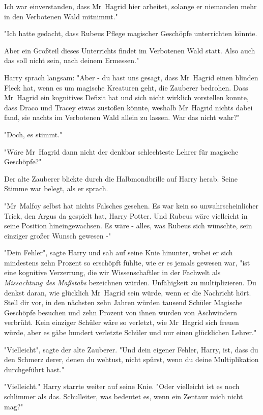 {Ich war einverstanden, dass Mr~Hagrid hier arbeitet, solange er niemanden mehr in den Verbotenen Wald mitnimmt."

"Ich hatte gedacht, dass Rubeus Pflege magischer Geschöpfe unterrichten könnte.

Aber ein Großteil dieses Unterrichts findet im Verbotenen Wald statt. Also auch das soll nicht sein, nach deinem Ermessen."

Harry sprach langsam: "Aber - du hast uns gesagt, dass Mr~Hagrid einen blinden Fleck hat, wenn es um magische Kreaturen geht, die Zauberer bedrohen. Dass Mr~Hagrid ein kognitives Defizit hat und sich nicht wirklich vorstellen konnte, dass Draco und Tracey etwas zustoßen könnte, weshalb Mr~Hagrid nichts dabei fand, sie nachts im Verbotenen Wald allein zu lassen. War das nicht wahr?"

"Doch, es stimmt."

"Wäre Mr~Hagrid dann nicht der denkbar schlechteste Lehrer für magische Geschöpfe?"

Der alte Zauberer blickte durch die Halbmondbrille auf Harry herab. Seine Stimme war belegt, als er sprach.

"Mr~Malfoy selbst hat nichts Falsches gesehen. Es war kein so unwahrscheinlicher Trick, den Argus da gespielt hat, Harry Potter. Und Rubeus wäre vielleicht in seine Position hineingewachsen. Es wäre - alles, was Rubeus sich wünschte, sein einziger großer Wunsch gewesen -"

"Dein Fehler", sagte Harry und sah auf seine Knie hinunter, wobei er sich mindestens zehn Prozent so erschöpft fühlte, wie er es jemals gewesen war, "ist eine kognitive Verzerrung, die wir Wissenschaftler in der Fachwelt als \emph{Missachtung des Maßstabs} bezeichnen würden. Unfähigkeit zu multiplizieren. Du denkst daran, wie glücklich Mr~Hagrid sein würde, wenn er die Nachricht hört. Stell dir vor, in den nächsten zehn Jahren würden tausend Schüler Magische Geschöpfe besuchen und zehn Prozent von ihnen würden von Aschwindern verbrüht. Kein einziger Schüler wäre so verletzt, wie Mr~Hagrid sich freuen würde, aber es gäbe hundert verletzte Schüler und nur einen glücklichen Lehrer."

"Vielleicht", sagte der alte Zauberer. "Und dein eigener Fehler, Harry, ist, dass du den Schmerz derer, denen du wehtust, nicht spürst, wenn du deine Multiplikation durchgeführt hast."

"Vielleicht." Harry starrte weiter auf seine Knie. "Oder vielleicht ist es noch schlimmer als das. Schulleiter, was bedeutet es, wenn ein Zentaur mich nicht mag?"

}
